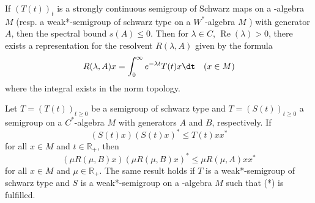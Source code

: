 \documentclass[%
,parskip = full
,english
,fontsize = 12pt]
	{scrartcl}
\begin{document}
%
If $ (T(t))_{t} $ is a strongly continuous semigroup of Schwarz maps on a \CA-algebra $M$ (resp. a weak*-semigroup of schwarz type on a $W^{*}$-algebra $M$ ) with generator $A$, then the spectral bound $s(A) \leq 0$. 
Then for $\lambda \in C$, $\operatorname{Re}(\lambda)>0$, there exists a representation for the resolvent $R(\lambda, A)$ given by the formula
%
\[
	R(\lambda, A) x=\int_{0}^{\infty} e^{-\lambda t} T(t) x \dt  \quad (x \in M)
\]
%
where the integral exists in the norm topology.
%
%
\begin{theorem}
Let $T=(T(t))_{t \geq 0}$ be a semigroup of schwarz type and $T=(S(t))_{t \geq 0}$ a semigroup on a $C^{*}$-algebra $M$ with generators $A$ and $B$, respectively. 
If
%
\begin{equation}
(S(t) x)(S(t) x)^{*} \leq T(t) x x^{*} \tag{*}
\end{equation}
%
for all $x \in M$ and $t \in \mathbb{R}_{+}$, then
%
\[
(\mu R(\mu, B) x)(\mu R(\mu, B) x)^{*} \leqslant \mu R(\mu, A) x x^{*}
\]
%
for all $x \in M$ and $\mu \in \mathbb{R}_{+}$. 
The same result holds if $T$ is a weak*-semigroup of schwarz type and $S$ is a weak*-semigroup on a \WA-algebra $ M $ such that (*) is fulfilled.
\end{theorem}
%
%
%
%
%
\end{document}
